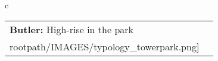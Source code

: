 \begin{table}[H]
        \begin{tabular}{c}
        \begin{tabular}{m{1.5in} m{2in}}
\textbf{Butler:} {High-rise in the park} & \texttt{[image: \\rootpath/IMAGES/typology\_towerpark.png]}
\end{tabular}\end{tabular}
        \end{table}